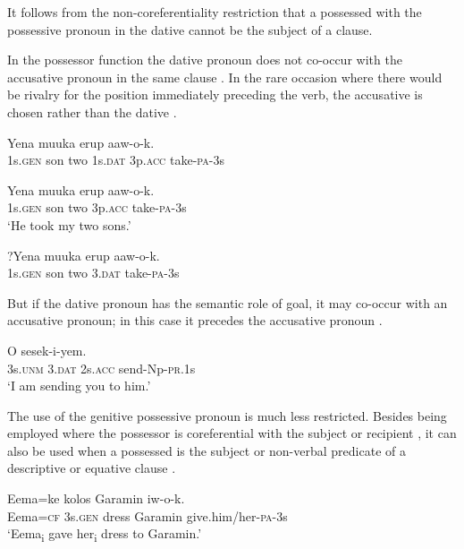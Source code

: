 It follows from the non-coreferentiality restriction that a possessed  with the possessive pronoun in the dative cannot be the subject of a clause. 

In the possessor function the dative pronoun does not co-occur with the accusative pronoun in the same clause . In the rare occasion where there would be rivalry for the position immediately preceding the verb, the accusative is chosen  rather than the dative . 

\ea%
\label{ex:3:x584}
\gll *Yena muuka erup   aaw-o-k. \\
1s.\textsc{gen} son two 1s.\textsc{dat} 3p.\textsc{acc} take-\textsc{pa}-3s\\
\glt %
\z

\ea%
\label{ex:3:x583}
\gll Yena muuka erup  aaw-o-k. \\
1s.\textsc{gen} son two 3p.\textsc{acc} take-\textsc{pa}-3s\\
\glt`He took my two sons.'
\z

\ea%
\label{ex:3:x1928}
\gll ?Yena muuka erup  aaw-o-k. \\
1s.\textsc{gen} son two 3.\textsc{dat} take-\textsc{pa}-3s\\
\glt %
\z

But if the dative pronoun has the semantic role of goal, it may co-occur with an accusative pronoun; in this case it precedes the accusative pronoun .

\ea%
\label{ex:3:x1576}
\gll O   sesek-i-yem. \\
3s.\textsc{unm} 3.\textsc{dat} 2s.\textsc{acc} send-Np-\textsc{pr}.1s\\
\glt`I am sending you to him.'
\z

The use of the genitive possessive pronoun is much less restricted. Besides being employed where the possessor is coreferential with the subject  or recipient , it can also be used when a possessed  is the subject or non-verbal predicate of a descriptive or equative clause . 

\ea%
\label{ex:3:x589}
\gll Eema=ke  kolos Garamin iw-o-k. \\
Eema=\textsc{cf} 3s.\textsc{gen} dress Garamin give.him/her-\textsc{pa}-3s\\
\glt`Eema\textsubscript{i} gave her\textsubscript{i} dress to Garamin.'
\z

